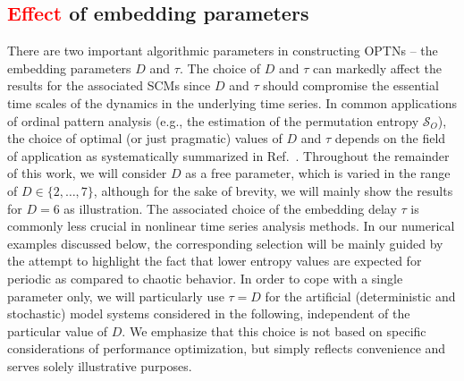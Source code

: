 \documentclass[aip,cha,reprint,nofootinbib]{revtex4-1}
\begin{document}
\subsection{\textcolor{red}{Effect} of embedding parameters} \label{sec:embeddings}
There are two important algorithmic parameters in constructing OPTNs -- the embedding parameters $D$ and $\tau$. The choice of $D$ and $\tau$ can markedly affect the results for the associated SCMs since $D$ and $\tau$ should compromise the essential time scales of the dynamics in the underlying time series. In common applications of ordinal pattern analysis (e.g., the estimation of the permutation entropy $\mathcal{S}_O$), the choice of optimal (or just pragmatic) values of $D$ and $\tau$ depends on the field of application as systematically summarized in Ref.~\cite{Riedl2013}. {\color{red}Throughout the remainder of this work, we will consider $D$ as a free parameter, which is varied in the range of $D \in \{2,\ldots,7\}$, although for the sake of brevity, we will mainly show the results for $D = 6$ as illustration. The associated choice of the embedding delay $\tau$ is commonly less crucial in nonlinear time series analysis methods. In our numerical examples discussed below, the corresponding selection will be mainly guided by the attempt to highlight the fact that lower entropy values are expected for periodic as compared to chaotic behavior. In order to cope with a single parameter only, we will particularly use $\tau=D$ for the artificial (deterministic and stochastic) model systems considered in the following, independent of the particular value of $D$. We emphasize that this choice is not based on specific considerations of performance optimization, but simply reflects convenience and serves solely illustrative purposes.}
\end{document}
